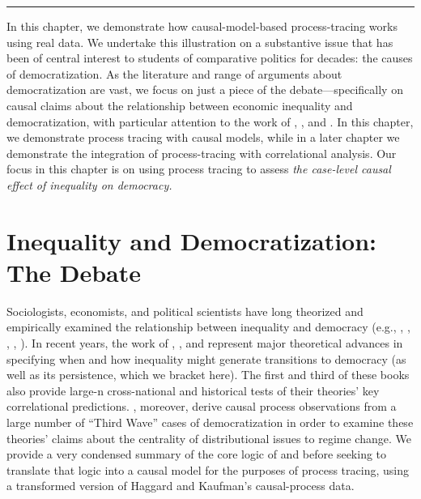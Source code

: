 \documentclass[12pt,]{book}
\begin{document}
\begin{center}\rule{0.5\linewidth}{\linethickness}\end{center}

In this chapter, we demonstrate how causal-model-based process-tracing works using real data. We undertake this illustration on a substantive issue that has been of central interest to students of comparative politics for decades: the causes of democratization. As the literature and range of arguments about democratization are vast, we focus on just a piece of the debate---specifically on causal claims about the relationship between economic inequality and democratization, with particular attention to the work of \citet{boix2003democracy}, \citet{acemoglu2005economic}, and \citet{haggard2012inequality}. In this chapter, we demonstrate process tracing with causal models, while in a later chapter we demonstrate the integration of process-tracing with correlational analysis. Our focus in this chapter is on using process tracing to assess \emph{the case-level causal effect of inequality on democracy.}

\hypertarget{inequality-and-democratization-the-debate}{%
\section{Inequality and Democratization: The Debate}\label{inequality-and-democratization-the-debate}}

Sociologists, economists, and political scientists have long theorized and empirically examined the relationship between inequality and democracy (e.g., \citet{dahl1973polyarchy}, \citet{bollen1985political}, \citet{acemoglu2005economic}, \citet{boix2003democracy}, \citet{ansell2014inequality}). In recent years, the work of \citet{boix2003democracy}, \citet{acemoglu2005economic}, and \citet{ansell2014inequality} represent major theoretical advances in specifying when and how inequality might generate transitions to democracy (as well as its persistence, which we bracket here). The first and third of these books also provide large-n cross-national and historical tests of their theories' key correlational predictions. \citet{haggard2012inequality}, moreover, derive causal process observations from a large number of ``Third Wave'' cases of democratization in order to examine these theories' claims about the centrality of distributional issues to regime change. We provide a very condensed summary of the core logic of \citet{boix2003democracy} and \citet{acemoglu2005economic} before seeking to translate that logic into a causal model for the purposes of process tracing, using a transformed version of Haggard and Kaufman's causal-process data.
\end{document}
